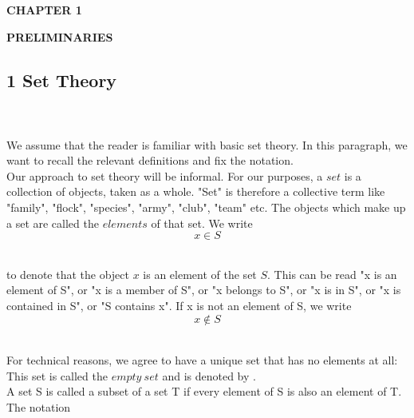 \documentclass[11 pt]{amsbook}
\begin{document}

\begin{center}
    \textbf{\Huge {CHAPTER 1}}
\end{center}

\vspace{15mm}

\begin{center}
    \textbf{\large {PRELIMINARIES}}
\end{center}

\vspace{10mm}

\subsection*{1 Set Theory}

\noindent \\ \\ We assume that the reader is familiar with basic set theory. In this paragraph, we want to recall the relevant definitions and fix the notation. \\

\noindent Our approach to set theory will be informal. For our purposes, a $set$ is a collection of objects, taken as a whole. "Set" is therefore a collective term like "family", "flock", "species", "army", "club", "team" etc. The objects which make up a set are called the $elements$ of that set. We write \\

\begin{equation*}
    x \in S
\end{equation*}

\noindent \\ to denote that the object $x$ is an element of the set $S$. This can be read "x is an element of S", or "x is a member of S", or "x belongs to S", or "x is in S", or "x is contained in S", or "S contains x". If x is not an element of S, we write \\

\begin{equation*}
    x \notin S
\end{equation*}

\noindent \\ For technical reasons, we agree to have a unique set that has no elements at all: This set is called the $empty \ set$ and is denoted by \emptyset. \\

A set S is called a subset of a set T if every element of S is also an
element of T. The notation
\end{document}
